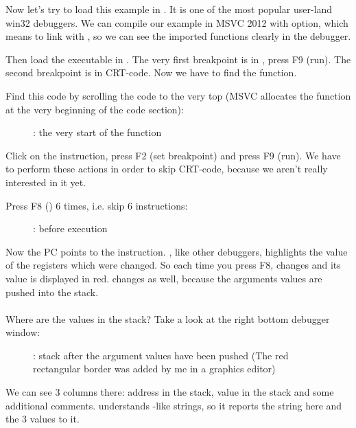 Now let's try to load this example in \olly.
It is one of the most popular user-land win32 debuggers.
We can compile our example in MSVC 2012 with  option, which means to link with ,
so we can see the imported functions clearly in the debugger.

Then load the executable in \olly.
The very first breakpoint is in , press 
F9 (run).
The second breakpoint is in \ac{CRT}-code.
Now we have to find the \main function.

Find this code by scrolling the code to the very top (MSVC allocates the \main function at the very beginning of the code section): 
\begin{figure}[H]
\centering
{}
\caption{\olly: the very start of the \main function}
\label{fig:printf3_olly_1}
\end{figure}

Click on the  instruction, press F2 (set breakpoint) and press F9 (run).
We have to perform these actions in order to skip \ac{CRT}-code, because we aren't really interested in it yet.

\clearpage
Press F8 (\stepover) 6 times, i.e. skip 6 instructions:

\begin{figure}[H]
\centering
{}
\caption{\olly: before \printf execution}
\label{fig:printf3_olly_2}
\end{figure}

Now the \ac{PC} points to the  instruction.
\olly, like other debuggers, highlights the value of the registers which were changed.
So each time you press F8, \EIP changes and its value is displayed in red.
\ESP changes as well, because the arguments values are pushed into the stack.\\
\\
Where are the values in the stack?
Take a look at the right bottom debugger window:

\begin{figure}[H]
\centering

\caption{\olly: stack after the argument values have been pushed (The red rectangular border was added by me in a graphics editor)}
\end{figure}

We can see 3 columns there: address in the stack, value in the stack and some additional \olly comments. 
\olly understands \printf{}-like strings, so it reports the string here and the 3 values  to it.

